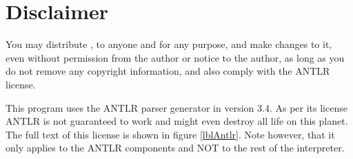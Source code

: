 \section{Disclaimer}
You may distribute \setlX{}, to anyone and for any purpose, and make changes to it, even without permission from the author or notice to the author, as long as you do not remove any copyright information, and also comply with the ANTLR license.

This program uses the ANTLR parser generator in version 3.4. As per its license ANTLR is not guaranteed to work and might even destroy all life on this planet. The full text of this license is shown in figure \ref{lblAntlr}. Note however, that it only applies to the ANTLR components and NOT to the rest of the interpreter.




